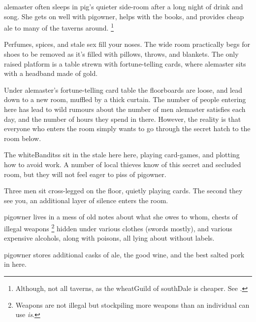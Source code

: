 \Gls{alemaster} often sleeps in \gls{pig}'s quieter side-room after a long night of drink and song.
She gets on well with \gls{pigowner}, helps with the books, and provides cheap ale to many of the taverns around.%
\footnote{Although, not all taverns, as the \gls{wheatGuild} of \gls{southDale} is cheaper.
See .}

\begin{boxtext}
  Perfumes, spices, and stale sex fill your noses.
  The wide room practically begs for shoes to be removed as it's filled with pillows, throws, and blankets.
  The only raised platform is a table strewn with fortune-telling cards, where \gls{alemaster} sits with a headband made of gold.
\end{boxtext}

Under \gls{alemaster}'s fortune-telling card table the floorboards are loose, and lead down to a new room, muffled by a thick curtain.
The number of people entering here has lead to wild rumours about the number of men \gls{alemaster} satisfies each day, and the number of hours they spend in there.
However, the reality is that everyone who enters the room simply wants to go through the secret hatch to the room below.

\alemaster


The \glspl{whiteBandits} sit in the stale here here, playing card-games, and plotting how to avoid work.
A number of local thieves know of this secret and secluded room, but they will not feel eager to piss of \gls{pigowner}.

\begin{boxtext}
  Three men sit cross-legged on the floor, quietly playing cards.
  The second they see you, an additional layer of silence enters the room.
\end{boxtext}



\Gls{pigowner} lives in a mess of old notes about what she owes to whom, chests of illegal weapons%
\footnote{Weapons are not illegal but stockpiling more weapons than an individual can use \emph{is}.}
hidden under various clothes (swords mostly), and various expensive alcohols, along with poisons, all lying about without labels.


\Gls{pigowner} stores additional casks of ale, the good wine, and the best salted pork in here.

